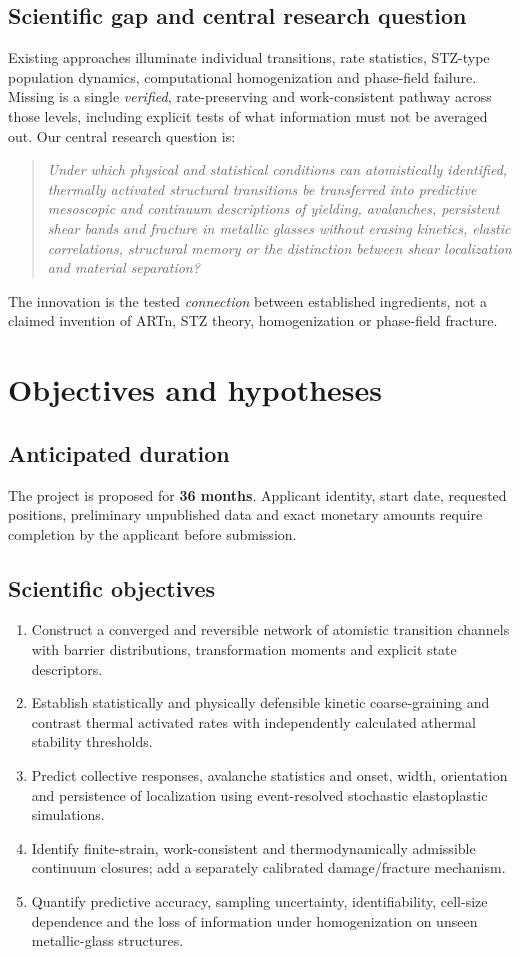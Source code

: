 \documentclass[11pt,a4paper]{article}
\begin{document}
\subsection{Scientific gap and central research question}
Existing approaches illuminate individual transitions, rate statistics, STZ-type population dynamics, computational homogenization and phase-field failure. Missing is a single \emph{verified}, rate-preserving and work-consistent pathway across those levels, including explicit tests of what information must not be averaged out. Our central research question is:
\begin{quote}\itshape
Under which physical and statistical conditions can atomistically identified, thermally activated structural transitions be transferred into predictive mesoscopic and continuum descriptions of yielding, avalanches, persistent shear bands and fracture in metallic glasses without erasing kinetics, elastic correlations, structural memory or the distinction between shear localization and material separation?
\end{quote}
The innovation is the tested \emph{connection} between established ingredients, not a claimed invention of ARTn, STZ theory, homogenization or phase-field fracture.

\section{Objectives and hypotheses}
\subsection{Anticipated duration}
The project is proposed for \textbf{36 months}. Applicant identity, start date, requested positions, preliminary unpublished data and exact monetary amounts require completion by the applicant before submission.
\subsection{Scientific objectives}
\begin{enumerate}[label=O\arabic*.,leftmargin=*]
\item Construct a converged and reversible network of atomistic transition channels with barrier distributions, transformation moments and explicit state descriptors.
\item Establish statistically and physically defensible kinetic coarse-graining and contrast thermal activated rates with independently calculated athermal stability thresholds.
\item Predict collective responses, avalanche statistics and onset, width, orientation and persistence of localization using event-resolved stochastic elastoplastic simulations.
\item Identify finite-strain, work-consistent and thermodynamically admissible continuum closures; add a separately calibrated damage/fracture mechanism.
\item Quantify predictive accuracy, sampling uncertainty, identifiability, cell-size dependence and the loss of information under homogenization on unseen metallic-glass structures.
\end{enumerate}
\end{document}

